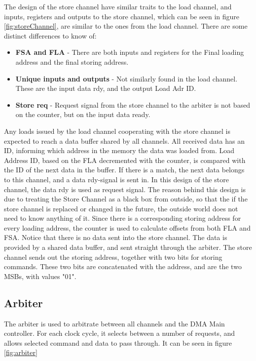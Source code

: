 \begin{appendix}
The design of the store channel have similar traits to the load channel, and inputs, registers and outputs to the store channel, which can be seen in figure \ref{fig:storeChannel}, are similar to the ones from the load channel.
There are some distinct differences to know of:
\begin{itemize}
    \item \textbf{FSA and FLA} - There are both inputs and registers for the Final loading address and the final storing address.
    \item \textbf{Unique inputs and outputs} - Not similarly found in the load channel.
    These are the input data rdy, and the output Load Adr ID.
    \item \textbf{Store req} - Request signal from the store channel to the arbiter is not based on the counter, but on the input data ready.
\end{itemize}

Any loads issued by the load channel cooperating with the store channel is expected to reach a data buffer shared by all channels.
All received data has an ID, informing which address in the memory the data was loaded from.
Load Address ID, based on the FLA decremented with the counter, is compared with the ID of the next data in the buffer.
If there is a match, the next data belongs to this channel, and a data rdy-signal is sent in.
In this design of the store channel, the data rdy is used as request signal.
The reason behind this design is due to treating the Store Channel as a black box from outside, so that the if the store channel is replaced or changed in the future, the outside world does not need to know anything of it.
Since there is a corresponding storing address for every loading address, the counter is used to calculate offsets from both FLA and FSA.
Notice that there is no data sent into the store channel.
The data is provided by a shared data buffer, and sent straight through the arbiter.
The store channel sends out the storing address, together with two bits for storing commands.
These two bits are concatenated with the address, and are the two MSBs, with values "01".

\subsection{Arbiter}
The arbiter is used to arbitrate between all channels and the DMA Main controller.
For each clock cycle, it selects between a number of requests, and allows selected command and data to pass through.
It can be seen in figure \ref{fig:arbiter}


\end{appendix}
